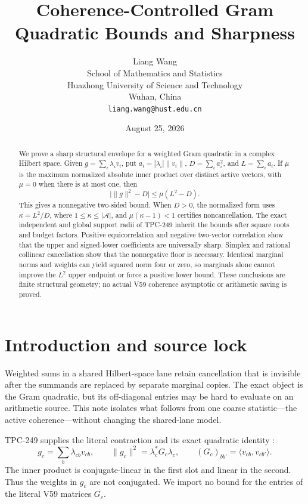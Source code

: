 \documentclass[11pt]{article}
\title{Coherence-Controlled Gram Quadratic Bounds and Sharpness}
\author{Liang Wang\\
School of Mathematics and Statistics\\
Huazhong University of Science and Technology\\
Wuhan, China\\
\texttt{liang.wang@hust.edu.cn}}
\date{August 25, 2026}
\theoremstyle{remark}
\newcommand{\A}{\mathcal A}
\begin{document}
\maketitle

\begin{abstract}
We prove a sharp structural envelope for a weighted Gram quadratic in a
complex Hilbert space.  Given $g=\sum_i\lambda_i v_i$, put
$a_i=|\lambda_i|\|v_i\|$, $D=\sum_i a_i^2$, and $L=\sum_i a_i$.  If $\mu$ is
the maximum normalized absolute inner product over distinct active vectors,
with $\mu=0$ when there is at most one, then
\[
 \bigl|\|g\|^2-D\bigr|\leq\mu(L^2-D).
\]
This gives a nonnegative two-sided bound.  When $D>0$, the normalized form uses
$\kappa=L^2/D$, where $1\leq\kappa\leq|\A|$, and
$\mu(\kappa-1)<1$ certifies noncancellation.  The exact independent and global
support radii of TPC-249 inherit the bounds after square roots and budget
factors.  Positive equicorrelation and negative two-vector correlation show
that the upper and signed-lower coefficients are universally sharp.  Simplex
and rational collinear cancellation show that the nonnegative floor is
necessary.  Identical marginal norms and weights can yield squared norm four
or zero, so marginals alone cannot improve the $L^2$ upper endpoint or force a
positive lower bound.  These conclusions are finite structural geometry; no
actual V59 coherence asymptotic or arithmetic saving is proved.
\end{abstract}

\section{Introduction and source lock}

Weighted sums in a shared Hilbert-space lane retain cancellation that is
invisible after the summands are replaced by separate marginal copies.  The
exact object is the Gram quadratic, but its off-diagonal entries may be hard to
evaluate on an arithmetic source.  This note isolates what follows from one
coarse statistic---the active coherence---without changing the shared-lane
model.

TPC-249 supplies the literal contraction and its exact quadratic identity
\cite{tpc249}:
\begin{equation}\label{eq:source}
 g_c=\sum_b\lambda_{cb}v_{cb},\qquad
 \|g_c\|^2=\lambda_c^*G_c\lambda_c,\qquad
 (G_c)_{bb'}=\langle v_{cb},v_{cb'}\rangle.
\end{equation}
The inner product is conjugate-linear in the first slot and linear in the
second.  Thus the weights in $g_c$ are not conjugated.  We import no bound for
the entries of the literal V59 matrices $G_c$.
\end{document}
